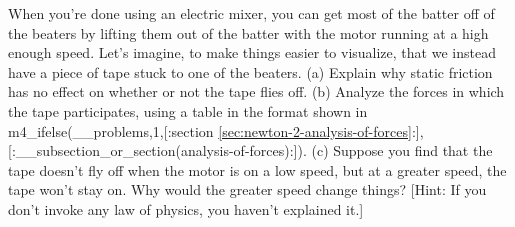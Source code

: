 When you're done using an electric mixer, you can get
most of the batter off of the beaters by lifting them out of
the batter with the motor running at a high enough speed.
Let's imagine, to make things easier to visualize, that we
instead have a piece of tape stuck to one of the beaters.\hwendpart
(a) Explain why static friction has no effect on whether or
not the tape flies off.\hwendpart
%
(b) Analyze the forces in which the tape participates, using
a table in the format shown in 
m4_ifelse(__problems,1,[:section \ref{sec:newton-2-analysis-of-forces}:],[:__subsection_or_section(analysis-of-forces):]).\hwendpart
(c) Suppose you find that the tape
doesn't fly off when the motor is on a low speed, but
at a greater speed, the tape won't stay on. Why would the
greater speed change things? [Hint: If you don't invoke any
law of physics, you haven't explained it.]
